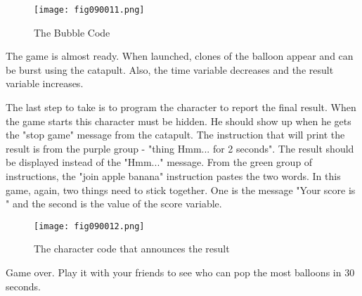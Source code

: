 \begin{figure}[H]
   \centering
   \texttt{[image: fig090011.png]}
   \caption{The Bubble Code}
\label{fig090011}
\end{figure}

The game is almost ready. When launched, clones of the balloon appear and can be burst using the catapult. Also, the time variable decreases and the result variable increases.

The last step to take is to program the character to report the final result. When the game starts this character must be hidden. He should show up when he gets the "stop game" message from the catapult. The instruction that will print the result is from the purple group - "thing Hmm... for 2 seconds". The result should be displayed instead of the "Hmm..." message. From the green group of instructions, the "join apple banana" instruction pastes the two words. In this game, again, two things need to stick together. One is the message "Your score is " and the second is the value of the score variable.

\begin{figure}[H]
   \centering
   \texttt{[image: fig090012.png]}
   \caption{The character code that announces the result}
\label{fig090012}
\end{figure}

Game over. Play it with your friends to see who can pop the most balloons in 30 seconds.
